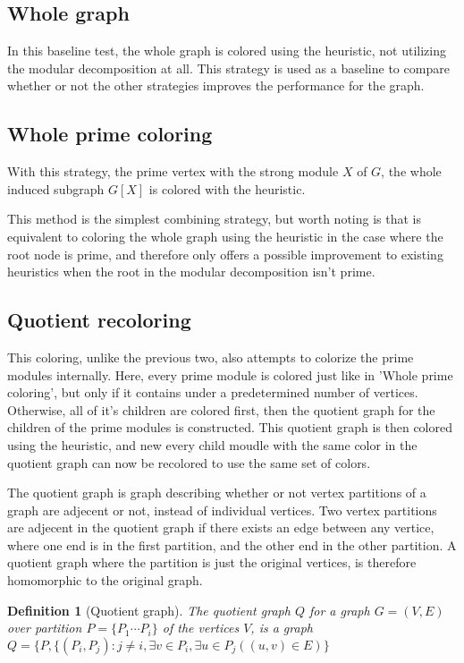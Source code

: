 \documentclass{amsart}
\newtheorem{definition}{Definition}[section]
\begin{document}
\subsection{Whole graph}

In this baseline test, the whole graph is colored using the heuristic, not
utilizing the modular decomposition at all. This strategy is used as a baseline
to compare whether or not the other strategies improves the performance for the
graph.

\subsection{Whole prime coloring}

With this strategy, the prime vertex with the strong module $X$ of $G$, the
whole induced subgraph $G[X]$ is colored with the heuristic.

This method is the simplest combining strategy, but worth noting is that is
equivalent to coloring the whole graph using the heuristic in the case where the
root node is prime, and therefore only offers a possible improvement to existing
heuristics when the root in the modular decomposition isn't prime.

\subsection{Quotient recoloring}

This coloring, unlike the previous two, also attempts to colorize the prime
modules internally. Here, every prime module is colored just like in 'Whole
prime coloring', but only if it contains under a predetermined number of
vertices. Otherwise, all of it's children are colored first, then the quotient
graph for the children of the prime modules is constructed. This quotient graph
is then colored using the heuristic, and new every child moudle with the same
color in the quotient graph can now be recolored to use the same set of colors.

The quotient graph is graph describing whether or not vertex partitions of a
graph are adjecent or not, instead of individual vertices. Two vertex
partitions are adjecent in the quotient graph if there exists an edge between
any vertice, where one end is in the first partition, and the other end in the
other partition. A quotient graph where the partition is just the original
vertices, is therefore homomorphic to the original graph.

\begin{definition}[Quotient graph]
    The quotient graph $Q$ for a graph $G = (V,E)$ over partition 
    $P = \{P_1 \cdots P_i\}$  of the vertices $V$, is a graph 
    $Q = \{P, \{(P_i,P_j) : j\neq i, \exists v \in P_i,\exists u \in P_j( (u,v)
    \in E)   \}   $
\end{definition}
\end{document}

